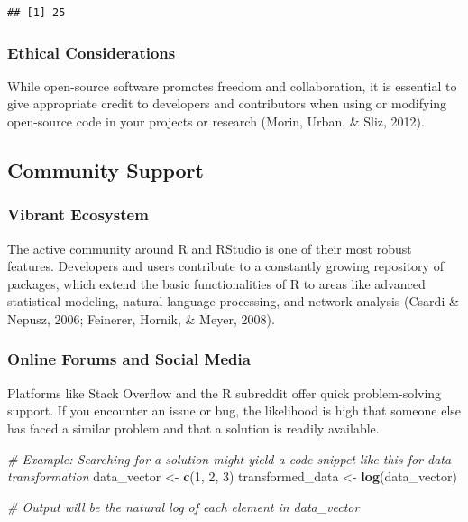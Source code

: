 \documentclass[
  b5paper]{book}
\newenvironment{Shaded}{\begin{snugshade}}{\end{snugshade}}
\newcommand{\CommentTok}[1]{\textcolor[rgb]{0.56,0.35,0.01}{\textit{#1}}}
\newcommand{\DecValTok}[1]{\textcolor[rgb]{0.00,0.00,0.81}{#1}}
\newcommand{\FunctionTok}[1]{\textcolor[rgb]{0.13,0.29,0.53}{\textbf{#1}}}
\newcommand{\NormalTok}[1]{#1}
\newcommand{\OtherTok}[1]{\textcolor[rgb]{0.56,0.35,0.01}{#1}}
\begin{document}
\begin{verbatim}
## [1] 25
\end{verbatim}

\hypertarget{ethical-considerations-7}{%
\subsubsection*{Ethical Considerations}\label{ethical-considerations-7}}

While open-source software promotes freedom and collaboration, it is essential to give appropriate credit to developers and contributors when using or modifying open-source code in your projects or research (Morin, Urban, \& Sliz, 2012).

\hypertarget{community-support}{%
\subsection*{Community Support}\label{community-support}}

\hypertarget{vibrant-ecosystem}{%
\subsubsection*{Vibrant Ecosystem}\label{vibrant-ecosystem}}

The active community around R and RStudio is one of their most robust features. Developers and users contribute to a constantly growing repository of packages, which extend the basic functionalities of R to areas like advanced statistical modeling, natural language processing, and network analysis (Csardi \& Nepusz, 2006; Feinerer, Hornik, \& Meyer, 2008).

\hypertarget{online-forums-and-social-media}{%
\subsubsection*{Online Forums and Social Media}\label{online-forums-and-social-media}}

Platforms like Stack Overflow and the R subreddit offer quick problem-solving support. If you encounter an issue or bug, the likelihood is high that someone else has faced a similar problem and that a solution is readily available.

\begin{Shaded}
\begin{Highlighting}[]
\CommentTok{\# Example: Searching for a solution might yield a code snippet like this for data transformation}
\NormalTok{data\_vector }\OtherTok{\textless{}{-}} \FunctionTok{c}\NormalTok{(}\DecValTok{1}\NormalTok{, }\DecValTok{2}\NormalTok{, }\DecValTok{3}\NormalTok{)}
\NormalTok{transformed\_data }\OtherTok{\textless{}{-}} \FunctionTok{log}\NormalTok{(data\_vector)}

\CommentTok{\# Output will be the natural log of each element in \textquotesingle{}data\_vector\textquotesingle{}}
\end{Highlighting}
\end{Shaded}
\end{document}
